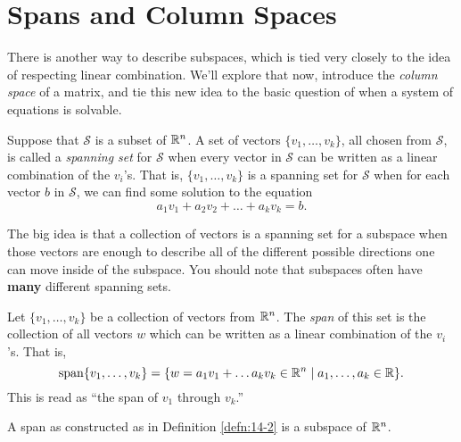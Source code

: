 \documentclass[elementsmain.tex]{subfiles}
\begin{document}
\section{Spans and Column Spaces}

There is another way to describe subspaces, which is tied very closely to the idea of respecting linear combination. We'll explore that now, introduce the \emph{column space} of a matrix, and tie this new idea to the basic question of when a system of equations is solvable.

\begin{definition}
Suppose that $\mathcal{S}$ is a subset of $\mathbb{R}^n$. A set of vectors 
$\{ v_1, \dots, v_k\}$, all chosen from $\mathcal{S}$, is called a \emph{spanning set} for $\mathcal{S}$ when every vector in $\mathcal{S}$ can be written as a linear combination of the $v_i$'s. That is, $\{v_1, \dots, v_k\}$ is a spanning set for $\mathcal{S}$ when for each vector $b$ in $\mathcal{S}$, we can find some solution to the equation
\[
a_1 v_1 + a_2 v_2 + \dots + a_k v_k = b.
\]
\end{definition}

The big idea is that a collection of vectors is a spanning set for a subspace when those vectors are enough to describe all of the different possible directions one can move inside of the subspace. You should note that subspaces often have \textbf{many} different spanning sets.

\begin{definition}[Span]\label{defn:14-2}
Let $\{v_1,  \dots, v_k\}$ be a collection of vectors from $\mathbb{R}^n$. The \emph{span} of this set is the collection of all vectors $w$ which can be written as a linear combination of the $v_i$'s. That is, 
\[
\mathrm{span}\{v_1,  \dots, v_k\} = \{ w = a_1 v_1 + \dots a_k v_k \in \mathbb{R}^n\mid a_1, \dots, a_k \in \mathbb{R}\}. 
\]
This is read as ``the span of $v_1$ through $v_k$.''
\end{definition}

\begin{theorem} A span as constructed as in Definition \ref{defn:14-2} is a subspace of $\mathbb{R}^n$.
\end{theorem}
\end{document}
